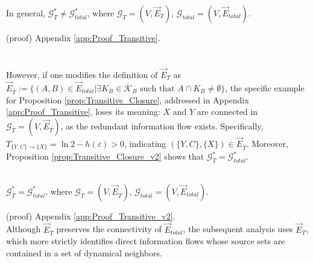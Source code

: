 \documentclass{comnet}%
\begin{document}
\begin{proposition}
	In general, $\mathcal{G}_{T}^{*} \not= \mathcal{G}_{total}^{*}$, where $\mathcal{G}_{T} = (V, \overrightarrow{E}_{T})$, $\mathcal{G}_{total} = (V, \overrightarrow{E}_{total})$.\\
	\label{prop:Transitive_Closure}\end{proposition}
(proof) Appendix \ref{app:Proof_Transitive}.\\
\quad \\ \quad \\
However, if one modifies the definition of $\overrightarrow{E}_{T}$ as $\overrightarrow{E}_{\bar{T}} := \{ (A, B) \in \overrightarrow{E}_{total} \allowbreak | \exists K_{B} \in \overline{\mathcal{K}}_{B} \text{\ such that\ } A \cap K_{B} \not= \emptyset \}$, the specific example for Proposition \ref{prop:Transitive_Closure}, addressed in Appendix \ref{app:Proof_Transitive}, loses its meaning: $X$ and $Y$ are connected in $\mathcal{G}_{\bar{T}}= (V, \overrightarrow{E}_{\bar{T}})$, as the redundant information flow exists. Specifically, $T_{\{Y, C \} \to \{ X \}} = \ln 2-h(\varepsilon)>0$, indicating $(\{Y, C \}, \{ X \}) \in \overrightarrow{E}_{\bar{T}}$. Moreover, Proposition \ref{prop:Transitive_Closure_v2} shows that $\mathcal{G}_{\bar{T}}^{*} = \mathcal{G}_{total}^{*}$.\\ \quad \\

\begin{proposition}
	$\mathcal{G}_{\bar{T}}^{*} = \mathcal{G}_{total}^{*}$, where $\mathcal{G}_{\bar{T}} = (V, \overrightarrow{E}_{\bar{T}})$, $\mathcal{G}_{total} = (V, \overrightarrow{E}_{total})$.\\
	\label{prop:Transitive_Closure_v2}\end{proposition}
(proof) Appendix \ref{app:Proof_Transitive_v2}.\\

Although $\overrightarrow{E}_{\bar{T}}$ preserves the connectivity of $\overrightarrow{E}_{total}$, the subsequent analysis uses $\overrightarrow{E}_{T}$, which more strictly identifies direct information flows whose source sets are contained in a set of dynamical neighbors.
\end{document}
